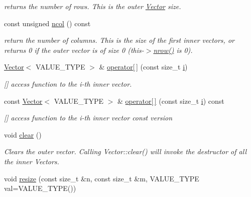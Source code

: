 \begin{DoxyCompactItemize}
\begin{DoxyCompactList}\small\item\em returns the number of rows. This is the outer \hyperlink{classoomph_1_1Vector}{Vector} size. \end{DoxyCompactList}\item 
const unsigned \hyperlink{classoomph_1_1VectorMatrix_a6f59576c296539356370814fc658f463}{ncol} () const
\begin{DoxyCompactList}\small\item\em return the number of columns. This is the size of the first inner vectors, or returns 0 if the outer vector is of size 0 (this-\/$>$\hyperlink{classoomph_1_1VectorMatrix_a9beb051515fea3a264843aae9783e386}{nrow()} is 0). \end{DoxyCompactList}\item 
\hyperlink{classoomph_1_1Vector}{Vector}$<$ V\+A\+L\+U\+E\+\_\+\+T\+Y\+PE $>$ \& \hyperlink{classoomph_1_1VectorMatrix_aeae9e2dcc8b7df4f0efd5890917013f9}{operator\mbox{[}$\,$\mbox{]}} (const size\+\_\+t \hyperlink{cfortran_8h_adb50e893b86b3e55e751a42eab3cba82}{i})
\begin{DoxyCompactList}\small\item\em \mbox{[}\mbox{]} access function to the i-\/th inner vector. \end{DoxyCompactList}\item 
const \hyperlink{classoomph_1_1Vector}{Vector}$<$ V\+A\+L\+U\+E\+\_\+\+T\+Y\+PE $>$ \& \hyperlink{classoomph_1_1VectorMatrix_a9b3af1734a4b7c8ba8db95d95b316904}{operator\mbox{[}$\,$\mbox{]}} (const size\+\_\+t \hyperlink{cfortran_8h_adb50e893b86b3e55e751a42eab3cba82}{i}) const
\begin{DoxyCompactList}\small\item\em \mbox{[}\mbox{]} access function to the i-\/th inner vector const version \end{DoxyCompactList}\item 
void \hyperlink{classoomph_1_1VectorMatrix_aa0f9cfd913d27cfb1e20e27a892d5468}{clear} ()
\begin{DoxyCompactList}\small\item\em Clears the outer vector. Calling Vector\+::clear() will invoke the destructor of all the inner Vectors. \end{DoxyCompactList}\item 
void \hyperlink{classoomph_1_1VectorMatrix_a8e7bc2b06afb92f161e35f1a180c2320}{resize} (const size\+\_\+t \&n, const size\+\_\+t \&m, V\+A\+L\+U\+E\+\_\+\+T\+Y\+PE val=V\+A\+L\+U\+E\+\_\+\+T\+Y\+PE())

\end{DoxyCompactItemize}
